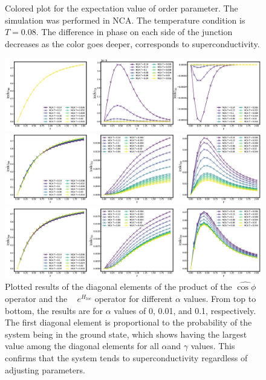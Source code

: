 \documentclass{article}[12pt]
\numberwithin{equation}{section}
\begin{document}
\begin{spacing}{1.5}
\begin{figure}[H]
  \caption{Colored plot for the expectation value of order parameter. The simulation was performed in NCA. The temperature condition is $T = 0.08$.
  The difference in phase on each side of the junction decreases as the color goes deeper, corresponds to superconductivity.}
  \vfill
\end{figure}
\pagebreak
\begin{figure}[htbp]
  \centerline{\includegraphics[width=15cm]{TexFigure/4/4_3_03_Matele_Ns3_alp0.png}}
  \centerline{\includegraphics[width=15cm]{TexFigure/4/4_3_04_Matele_Ns3_alp0_1.png}}
  \centerline{\includegraphics[width=15cm]{TexFigure/4/4_3_05_Matele_Ns3_alp1.png}}
  \caption{Plotted results of the diagonal elements of the product of the $\hat{\cos\phi}$ operator and the  
  $e^{H_{loc}}$ operator for different $\alpha$ values. From top to bottom, the results are for $\alpha$ 
  values of 0, 0.01, and 0.1, respectively. The first diagonal element is proportional to the probability of 
  the system being in the ground state, which shows having the largest value among the diagonal elements 
  for all $\alpha $and $\gamma$ values. This confirms that the system tends to superconductivity regardless of 
  adjusting parameters.}
  \end{figure}
\pagebreak

\end{spacing}
\end{document}
